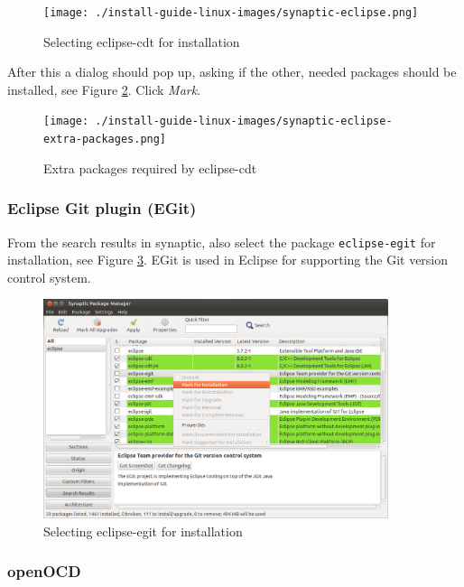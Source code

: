 \documentclass[a4paper, 10pt]{article}
\begin{document}
    \begin{figure}[H]
    \centering
        \texttt{[image: ./install-guide-linux-images/synaptic-eclipse.png]}
        \caption{Selecting eclipse-cdt for installation}
        \label{fig:synaptic-eclipse}
    \end{figure}

After this a dialog should pop up, asking if the other, needed packages should be installed,
see Figure \ref{fig:synaptic-eclipse-extra-packages.png}. Click \emph{Mark}.

    \begin{figure}[H]
    \centering
        \texttt{[image: ./install-guide-linux-images/synaptic-eclipse-extra-packages.png]}
        \caption{Extra packages required by eclipse-cdt}
        \label{fig:synaptic-eclipse-extra-packages.png}
    \end{figure}

\subsubsection{Eclipse Git plugin (EGit)}

From the search results in synaptic, also select the package
\verb+eclipse-egit+ for installation, see
Figure \ref{fig:synapic-eclipse-egit.png}.
EGit is used in Eclipse for supporting the Git version control system.

    \begin{figure}[H]
    \centering
        \includegraphics[width=0.9\textwidth]{./install-guide-linux-images/synaptic-eclipse-egit.png}
        \caption{Selecting eclipse-egit for installation}
        \label{fig:synapic-eclipse-egit.png}
    \end{figure}

\subsubsection{openOCD}
\end{document}

